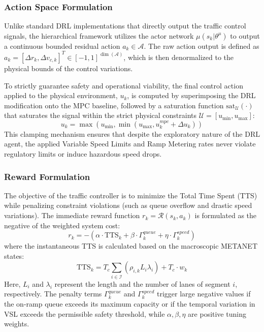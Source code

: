 \subsubsection*{Action Space Formulation}
Unlike standard DRL implementations that directly output the traffic control signals, the hierarchical framework utilizes the actor network $\mu(s_k | \theta^\mu)$ to output a continuous bounded residual action $a_k \in \mathcal{A}$. 
The raw action output is defined as $a_k = [\Delta r_k, \Delta v_{c,k}]^T \in [-1, 1]^{\dim(\mathcal{A})}$, which is then denormalized to the physical bounds of the control variations.

To strictly guarantee safety and operational viability, the final control action applied to the physical environment, $u_k$, is computed by superimposing the DRL modification onto the MPC baseline, followed by a saturation function $\text{sat}_{\mathcal{U}}(\cdot)$ that saturates the signal within the strict physical constraints $\mathcal{U} = [u_{\min}, u_{\max}]$:
\begin{equation}
    u_k = \max \left( u_{\min}, \min \left( u_{\max}, u_k^{mpc} + \Delta u_k \right) \right)
\end{equation}
This clamping mechanism ensures that despite the exploratory nature of the DRL agent, the applied Variable Speed Limits and Ramp Metering rates never violate regulatory limits or induce hazardous speed drops.

\subsubsection*{Reward Formulation}
The objective of the traffic controller is to minimize the Total Time Spent (TTS) while penalizing constraint violations (such as queue overflow and drastic speed variations). The immediate reward function $r_k = \mathcal{R}(s_k, a_k)$ is formulated as the negative of the weighted system cost:
\begin{equation}
    r_k = - \left( \alpha \cdot \text{TTS}_k + \beta \cdot \Gamma_k^{queue} + \eta \cdot \Gamma_k^{speed} \right)
\end{equation}
where the instantaneous TTS is calculated based on the macroscopic METANET states:
\begin{equation}
    \text{TTS}_k = T_c \sum_{i \in \mathcal{I}} \left( \rho_{i,k} L_i \lambda_i \right) + T_c \cdot w_k
\end{equation}
Here, $L_i$ and $\lambda_i$ represent the length and the number of lanes of segment $i$, respectively. The penalty terms $\Gamma_k^{queue}$ and $\Gamma_k^{speed}$ trigger large negative values if the on-ramp queue exceeds its maximum capacity or if the temporal variation in VSL exceeds the permissible safety threshold, while $\alpha, \beta, \eta$ are positive tuning weights.


